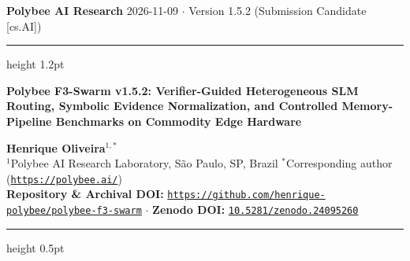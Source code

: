\documentclass[10pt,a4paper]{article}
\begin{document}
\thispagestyle{fancy}
\noindent
{\large\textbf{\textcolor{primary}{Polybee AI Research}}} \hfill {\small\textcolor{slate}{2026-11-09 $\cdot$ Version 1.5.2 (Submission Candidate [cs.AI])}}
\vspace{2pt}
\hrule height 1.2pt
\vspace{11pt}

{\LARGE\textbf{Polybee F3-Swarm v1.5.2: Verifier-Guided Heterogeneous SLM Routing, Symbolic Evidence Normalization, and Controlled Memory-Pipeline Benchmarks on Commodity Edge Hardware}}

\vspace{9pt}
\noindent
{\normalsize \textbf{Henrique Oliveira}$^{1,*}$ } \\[3pt]
{\small $^1$Polybee AI Research Laboratory, S\~ao Paulo, SP, Brazil \quad $^*$Corresponding author (\texttt{\href{https://polybee.ai/}{https://polybee.ai/}})} \\[2pt]
{\small \textbf{Repository \& Archival DOI:} \texttt{\href{https://github.com/henrique-polybee/polybee-f3-swarm}{https://github.com/henrique-polybee/polybee-f3-swarm}} $\cdot$ \textbf{Zenodo DOI:} \texttt{\href{https://doi.org/10.5281/zenodo.24095260}{10.5281/zenodo.24095260}}}

\vspace{7pt}
\hrule height 0.5pt
\vspace{5pt}
\end{document}
